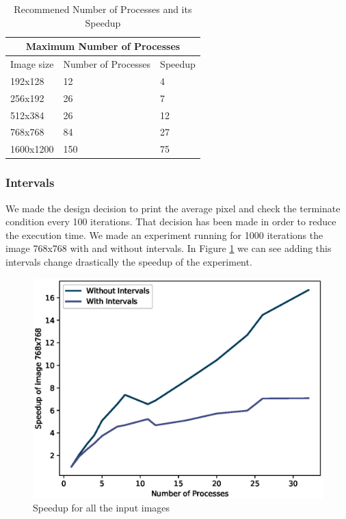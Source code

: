 \documentclass[12pt,a4paper]{article}
\begin{document}
	      \begin{table}[h!]
	       \centering
	       \begin{tabular}{|p{3cm}||p{5cm}|p{3cm}|}
	         \hline
	         \multicolumn{3}{|c|}{Maximum Number of Processes} \\
	         \hline
	         Image size&Number of Processes&Speedup\\
	         \hline
	         192x128&12&4\\
	         256x192&26&7\\
	         512x384&26&12\\
	         768x768&84&27\\
	         1600x1200&150&75\\
	         \hline
	       \end{tabular}
	       \caption{Recommened Number of Processes and its Speedup}
	       \label{tableSpeedup}
	      \end{table}

        \subsubsection{Intervals}
          We made the design decision to print the average pixel and check the terminate condition every 100 iterations. That decision has been made in order to reduce the execution time. We made an experiment running for 1000 iterations the image 768x768 with and without intervals. In Figure \ref{speedupWithInterval} we can see adding this intervals change drastically the speedup of the experiment. 

          \begin{figure}[ht]
              \centering
              \includegraphics[scale=0.6]{../graphs/speedupInterval.eps}
              \caption{Speedup for all the input images}
              \label{speedupWithInterval}
          \end{figure}
\end{document}
